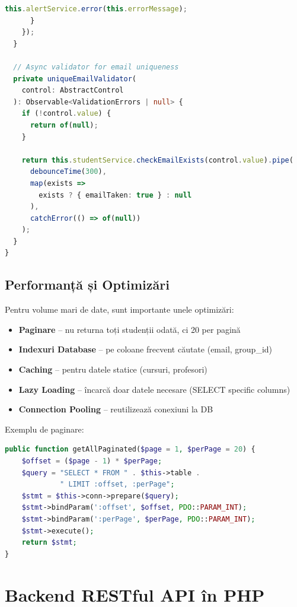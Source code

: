 \begin{lstlisting}[language=TypeScript]
        this.alertService.error(this.errorMessage);
      }
    });
  }

  // Async validator for email uniqueness
  private uniqueEmailValidator(
    control: AbstractControl
  ): Observable<ValidationErrors | null> {
    if (!control.value) {
      return of(null);
    }

    return this.studentService.checkEmailExists(control.value).pipe(
      debounceTime(300),
      map(exists =>
        exists ? { emailTaken: true } : null
      ),
      catchError(() => of(null))
    );
  }
}
\end{lstlisting}

\subsection{Performanță și Optimizări}

Pentru volume mari de date, sunt importante unele optimizări:

\begin{itemize}
    \item \textbf{Paginare} – nu returna toți studenții odată, ci 20 per pagină
    \item \textbf{Indexuri Database} – pe coloane frecvent căutate (email, group_id)
    \item \textbf{Caching} – pentru datele statice (cursuri, profesori)
    \item \textbf{Lazy Loading} – încarcă doar datele necesare (SELECT specific columns)
    \item \textbf{Connection Pooling} – reutilizează conexiuni la DB
\end{itemize}

Exemplu de paginare:

\begin{lstlisting}[language=PHP]
public function getAllPaginated($page = 1, $perPage = 20) {
    $offset = ($page - 1) * $perPage;
    $query = "SELECT * FROM " . $this->table .
             " LIMIT :offset, :perPage";
    $stmt = $this->conn->prepare($query);
    $stmt->bindParam(':offset', $offset, PDO::PARAM_INT);
    $stmt->bindParam(':perPage', $perPage, PDO::PARAM_INT);
    $stmt->execute();
    return $stmt;
}
\end{lstlisting}

\section{Backend RESTful API în PHP}
\label{sec:backend-php}

